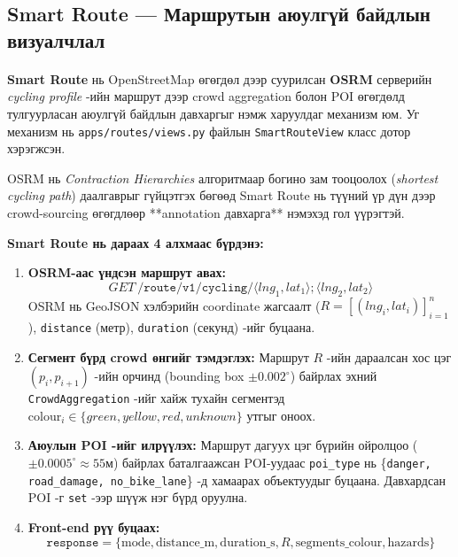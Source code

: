 \subsection{Smart Route — Маршрутын аюулгүй байдлын визуалчлал}
\paragraph{}
\textbf{Smart Route} нь OpenStreetMap өгөгдөл дээр суурилсан \textbf{OSRM} серверийн \textit{cycling profile} -ийн маршрут дээр crowd aggregation болон POI өгөгдөлд тулгуурласан аюулгүй байдлын давхаргыг нэмж харуулдаг механизм юм. Уг механизм нь \texttt{apps/routes/views.py} файлын \texttt{SmartRouteView} класс дотор хэрэгжсэн.

OSRM нь \textit{Contraction Hierarchies} алгоритмаар богино зам тооцоолох (\textit{shortest cycling path}) даалгаврыг гүйцэтгэх бөгөөд Smart Route нь түүний үр дүн дээр crowd-sourcing өгөгдлөөр **annotation давхарга** нэмэхэд гол үүрэгтэй.

\textbf{Smart Route нь дараах 4 алхмаас бүрдэнэ:}
\begin{enumerate}
    \item \textbf{OSRM-аас үндсэн маршрут авах:}
    \begin{equation*}
    \mathit{GET}~\texttt{/route/v1/cycling/} \langle lng_1, lat_1 \rangle ; \langle lng_2, lat_2 \rangle
    \end{equation*}
    OSRM нь GeoJSON хэлбэрийн coordinate жагсаалт ($R = [(lng_i, lat_i)]_{i=1}^n$), \texttt{distance} (метр), \texttt{duration} (секунд) -ийг буцаана.
    \item \textbf{Сегмент бүрд crowd өнгийг тэмдэглэх:} Маршрут $R$ -ийн дараалсан хос цэг $(p_i, p_{i+1})$ -ийн орчинд (bounding box $\pm 0.002^{\circ}$) байрлах эхний \texttt{CrowdAggregation} -ийг хайж тухайн сегментэд $\text{colour}_i \in \{green, yellow, red, unknown\}$ утгыг оноох.
    \item \textbf{Аюулын POI -ийг илрүүлэх:} Маршрут дагуух цэг бүрийн ойролцоо ($\pm 0.0005^{\circ} \approx 55$м) байрлах баталгаажсан POI-уудаас \texttt{poi\_type} нь \{\texttt{danger, road\_damage, no\_bike\_lane}\} -д хамаарах объектуудыг буцаана. Давхардсан POI -г \texttt{set} -ээр шүүж нэг бүрд оруулна.
    \item \textbf{Front-end рүү буцаах:}
    \begin{equation*}
    \texttt{response} = \{ \text{mode}, \text{distance\_m}, \text{duration\_s}, R, \text{segments\_colour}, \text{hazards} \}
    \end{equation*}
\end{enumerate}


